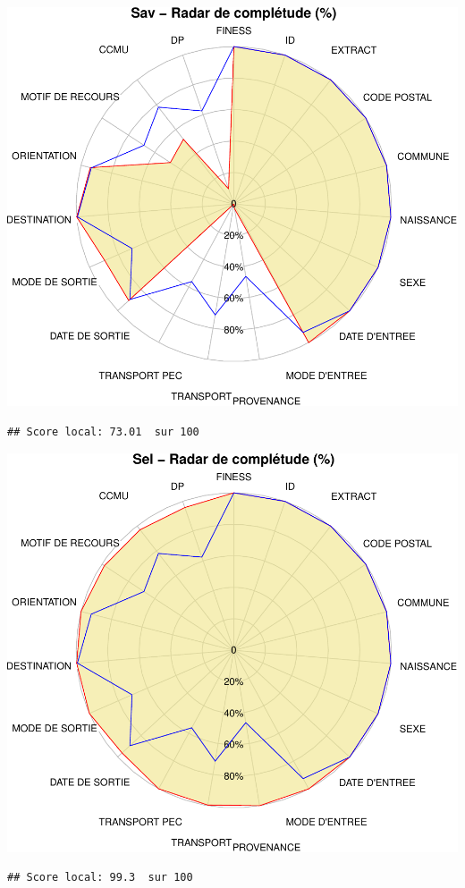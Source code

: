 \documentclass[]{article}
\begin{document}
\includegraphics{completude_files/figure-latex/finess-1.pdf}

\begin{verbatim}
## Score local: 73.01  sur 100
\end{verbatim}

\includegraphics{completude_files/figure-latex/finess-2.pdf}

\begin{verbatim}
## Score local: 99.3  sur 100
\end{verbatim}
\end{document}
